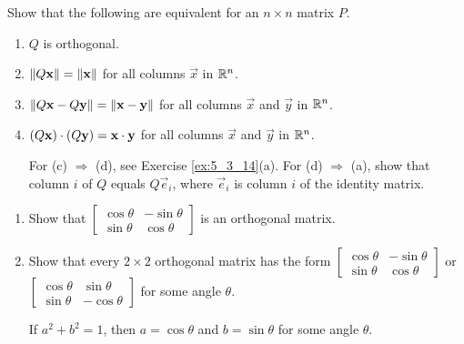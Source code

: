 \documentclass{ximera}
\begin{document}
\begin{problem}\label{prob:ortho25}
Show that the following are equivalent for an $n \times n$ matrix $P$.


\begin{enumerate} 
\item $Q$ is orthogonal.

\item $\left\lVert Q\mathbf{x}\right\rVert = \left\lVert\mathbf{x}\right\rVert$ for all columns $\vec{x}$ in $\mathbb{R}^n$.

\item $\left\lVert Q\mathbf{x} - Q\mathbf{y}\right\rVert = \left\lVert\mathbf{x} - \mathbf{y}\right\rVert$ for all columns $\vec{x}$ and $\vec{y}$ in $\mathbb{R}^n$.

\item $(Q\mathbf{x}) \cdot (Q\mathbf{y}) = \mathbf{x} \cdot \mathbf{y}$ for all columns $\vec{x}$ and $\vec{y}$ in $\mathbb{R}^n$.

\begin{hint}
For (c) $\Rightarrow$ (d), see Exercise \ref{ex:5_3_14}(a). For (d) $\Rightarrow$ (a), show that column $i$ of $Q$ equals $Q\vec{e}_{i}$, where $\vec{e}_{i}$ is column $i$ of the identity matrix.
\end{hint}
\end{enumerate}
\end{problem}



\begin{problem}\label{prob:rotation_ortho}
\begin{enumerate}
    \item Show that $\begin{bmatrix}
\cos\theta & -\sin\theta \\
\sin\theta & \cos\theta
\end{bmatrix}$ is an orthogonal matrix.

    \item Show that every $2 \times 2$ orthogonal matrix has the form $\begin{bmatrix}
\cos\theta & -\sin\theta \\
\sin\theta & \cos\theta
\end{bmatrix}$ or $\begin{bmatrix}
\cos\theta & \sin\theta \\
\sin\theta & -\cos\theta
\end{bmatrix}$
 for some angle $\theta$.
 \begin{hint}
 If $a^{2} + b^{2} = 1$, then $a = \cos\theta$ and $b = \sin\theta$ for some angle $\theta$.
 \end{hint}
\end{enumerate}

\end{problem}
\end{document}
